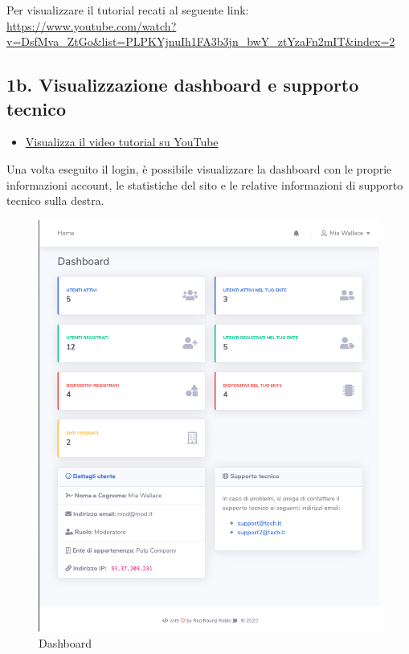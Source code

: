 	Per visualizzare il tutorial recati al seguente link: 
	\url{https://www.youtube.com/watch?v=DsfMva_ZtGo&list=PLPKYjnuIh1FA3b3jn_bwY_ztYzaFn2mIT&index=2}

\newpage \subsection{1b. Visualizzazione dashboard e supporto tecnico}
	

	\begin{itemize}
		\item \href{https://www.youtube.com/watch?v=PjySMOLCtMA&list=PLPKYjnuIh1FA3b3jn_bwY_ztYzaFn2mIT&index=3}{Visualizza il video tutorial su YouTube} 
	\end{itemize}
	Una volta eseguito il login, è possibile visualizzare la dashboard con le proprie informazioni account, le statistiche del sito e le relative informazioni di supporto tecnico sulla destra.

	\begin{figure}[H]
		\centering
		\includegraphics[scale=0.600]{res/images/membro/dashboard.png}
		\caption{Dashboard}
	\end{figure}

